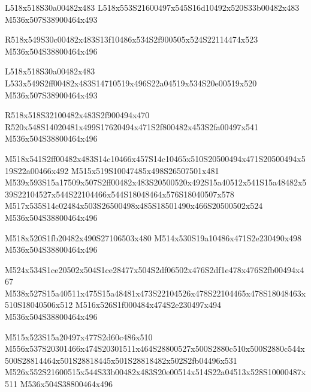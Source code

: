 \documentclass{article}
\begin{document}
\begin{multicols}{5}
\begin{center}
L518x518S30a00482x483 %
L518x553S21600497x545S16d10492x520S33b00482x483 %
M536x507S38900464x493 %

R518x549S30c00482x483S13f10486x534S2f900505x524S22114474x523 %
M536x504S38800464x496 %

L518x518S30a00482x483 %
L533x549S2ff00482x483S14710519x496S22a04519x534S20e00519x520 %
M536x507S38900464x493 %

R518x518S32100482x483S2f900494x470 %
R520x548S14020481x499S17620494x471S2f800482x453S2fa00497x541 %
M536x504S38800464x496 %

M518x541S2ff00482x483S14c10466x457S14c10465x510S20500494x471S20500494x519S22a00466x492 %
M515x519S10047485x498S26507501x481 %
M539x593S15a17509x507S2ff00482x483S20500520x492S15a40512x541S15a48482x539S22104527x544S22104466x544S18048464x576S18040507x578 %
M517x535S14c02484x503S26500498x485S18501490x466S20500502x524 %
M536x504S38800464x496 %

M518x520S1fb20482x490S27106503x480 %
M514x530S19a10486x471S2e230490x498 %
M536x504S38800464x496 %

M524x534S1ce20502x504S1ce28477x504S2df06502x476S2df1e478x476S2fb00494x467 %
M538x527S15a40511x475S15a48481x473S22104526x478S22104465x478S18048463x510S18040506x512 %
M516x526S1f000484x474S2e230497x494 %
M536x504S38800464x496 %

M515x523S15a20497x477S2d60c486x510 %
M556x537S20301466x474S20301511x464S28800527x500S2880c510x500S2880c544x500S28814464x501S28818445x501S28818482x502S2fb04496x531 %
M526x552S21600515x544S33b00482x483S20e00514x514S22a04513x528S10000487x511 %
M536x504S38800464x496 %

\end{center}
\end{multicols}
\end{document}
